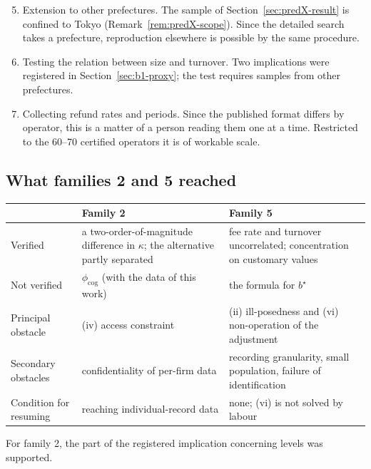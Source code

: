 \begin{enumerate}[label=(\arabic*)]
\setcounter{enumi}{4}
\item Extension to other prefectures. The sample of Section~\ref{sec:predX-result} is confined to
Tokyo (Remark~\ref{rem:predX-scope}). Since the detailed search takes a prefecture, reproduction
elsewhere is possible by the same procedure.

\item Testing the relation between size and turnover. Two implications were registered in
Section~\ref{sec:b1-proxy}; the test requires samples from other prefectures.

\item Collecting refund rates and periods. Since the published format differs by operator, this is
a matter of a person reading them one at a time. Restricted to the 60--70 certified operators it
is of workable scale.
\end{enumerate}

\subsection{What families 2 and 5 reached}

\begin{center}
\begin{tabularx}{\textwidth}{@{}lXX@{}}
\toprule
 & Family 2 & Family 5 \\
\midrule
Verified & a two-order-of-magnitude difference in $\kappa$; the alternative partly separated
 & fee rate and turnover uncorrelated; concentration on customary values \\
Not verified & $\phi_{\mathrm{cog}}$ (with the data of this work) & the formula for $b^\star$ \\
Principal obstacle & (iv) access constraint & (ii) ill-posedness and (vi) non-operation of the adjustment \\
Secondary obstacles & confidentiality of per-firm data & recording granularity, small population, failure of identification \\
Condition for resuming & reaching individual-record data & none; (vi) is not solved by labour \\
\bottomrule
\end{tabularx}
\label{tab:family2-5-summary}
\end{center}

For family 2, the part of the registered implication concerning levels was supported.

